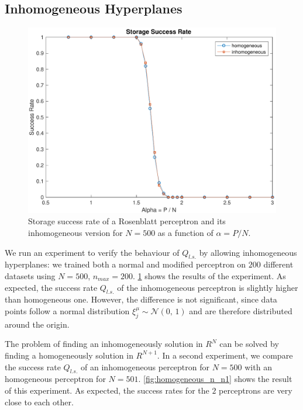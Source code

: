 \subsection{Inhomogeneous Hyperplanes}
\label{subsec:homogeneous}
\begin{figure}[t]
	\centering
	\includegraphics[width=\columnwidth]{figures/homogeneous}
    \caption{Storage success rate of a Rosenblatt perceptron and its inhomogeneous version for $N = 500$ as a function of $\alpha = P / N$.}
	\label{fig:homogeneous}
\end{figure}

We run an experiment to verify the behaviour of $Q_{l.s.}$ by allowing inhomogeneous hyperplanes:
we trained both a normal and modified perceptron on $200$ different datasets using $N = 500$, $n_{max} = 200$. 
\cref{fig:homogeneous} shows the results of the experiment.
As expected, the success rate $Q_{l.s.}$ of the inhomogeneous perceptron is slightly higher than homogeneous one.
However, the difference is not significant, since data points follow a normal distribution $\xi^\mu_j \sim \mathcal{N}(0,\,1)$ and are therefore distributed around the origin.

The problem of finding an inhomogeneously solution in $R^{N}$ can be solved by finding a homogeneously solution in $R^{N + 1}$.
In a second experiment, we compare the success rate $Q_{l.s.}$ of an inhomogeneous perceptron for $N = 500$ with an homogeneous perceptron for $N = 501$.
\cref{fig:homogeneous_n_n1} shows the result of this experiment.
As expected, the success rates for the $2$ perceptrons are very close to each other.

